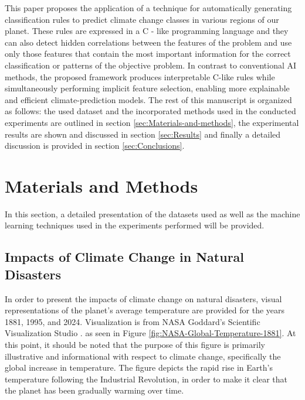 \documentclass[12pt]{Definitions/academia}
\begin{document}
This paper proposes the application of a technique for automatically
generating classification rules to predict climate change classes
in various regions of our planet. These rules are expressed in a C
- like programming language and they can also detect hidden correlations
between the features of the problem and use only those features that
contain the most important information for the correct classification
or patterns of the objective problem. In contrast to conventional
AI methods, the proposed framework produces interpretable C\nobreakdash-like
rules while simultaneously performing implicit feature selection,
enabling more explainable and efficient climate\nobreakdash-prediction
models.
The rest of this manuscript is organized as follows: the used dataset
and the incorporated methods used in the conducted experiments are
outlined in section \ref{sec:Materials-and-methods}, the experimental
results are shown and discussed in section \ref{sec:Results} and finally a
detailed discussion is provided in section \ref{sec:Conclusions}.

\section{Materials and Methods\label{sec:Materials-and-methods}}

In this section, a detailed presentation of the datasets used as well
as the machine learning techniques used in the experiments performed
will be provided.

\subsection{\textmd{Impacts of Climate Change in Natural Disasters}}
In order to present the impacts of climate change on natural disasters,
visual representations of the planet\textquoteright s average temperature
are provided for the years 1881, 1995, and 2024. Visualization is
from NASA Goddard's Scientific Visualization Studio \cite{NASA 2024}. 
as seen in Figure
\ref{fig:NASA-Global-Temperature-1881}.
At this point, it should be noted that the purpose of this figure is primarily illustrative and informational with respect to climate change, specifically the global increase in temperature. The figure depicts the rapid rise in Earth's temperature following the Industrial Revolution, in order to make it clear that the planet has been gradually warming over time.
\end{document}
